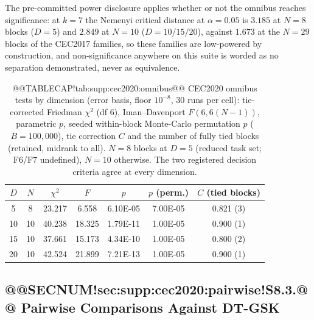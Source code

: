 \documentclass[10pt,a4paper]{article}
\newcommand{\dtgsk}{DT-GSK}
\begin{document}
The pre-committed power disclosure applies whether or not the omnibus
reaches significance: at $k = 7$ the Nemenyi critical distance at
$\alpha = 0.05$ is $3.185$ at $N = 8$ blocks ($D = 5$) and $2.849$ at
$N = 10$ ($D = 10/15/20$), against $1.673$ at the $N = 29$ blocks of the
CEC2017 families, so these families are low-powered by construction, and
non-significance anywhere on this suite is worded as no separation
demonstrated, never as equivalence.




\begin{table}[H]
\caption{@@TABLECAP!tab:supp:cec2020:omnibus@@ CEC2020 omnibus tests by dimension (error basis, floor
$10^{-8}$, 30 runs per cell): tie-corrected Friedman $\chi^{2}$ (df 6),
Iman--Davenport $F(6, 6(N-1))$, parametric $p$, seeded within-block
Monte-Carlo permutation $p$ ($B = 100{,}000$), tie correction $C$ and the
number of fully tied blocks (retained, midrank to all).  $N = 8$ blocks
at $D = 5$ (reduced task set; F6/F7 undefined), $N = 10$ otherwise.  The
two registered decision criteria agree at every dimension.
}\label{tab:supp:cec2020:omnibus}

\zebra
\begin{tabular}{ccccccc}
\toprule
\textbf{$D$} & \textbf{$N$} & \textbf{$\chi^{2}$} & \textbf{$F$} &
\textbf{$p$} & \textbf{$p$ (perm.)} & \textbf{$C$ (tied blocks)} \\
\midrule
5 & 8 & 23.217 & 6.558 & 6.10E-05 & 7.00E-05 & 0.821 (3) \\
10 & 10 & 40.238 & 18.325 & 1.79E-11 & 1.00E-05 & 0.900 (1) \\
15 & 10 & 37.661 & 15.173 & 4.34E-10 & 1.00E-05 & 0.800 (2) \\
20 & 10 & 42.524 & 21.899 & 7.21E-13 & 1.00E-05 & 0.900 (1) \\
\bottomrule
\end{tabular}
\end{table}

\subsection{@@SECNUM!sec:supp:cec2020:pairwise!S8.3.@@ Pairwise Comparisons Against \dtgsk{}}\label{sec:supp:cec2020:pairwise}
\end{document}
